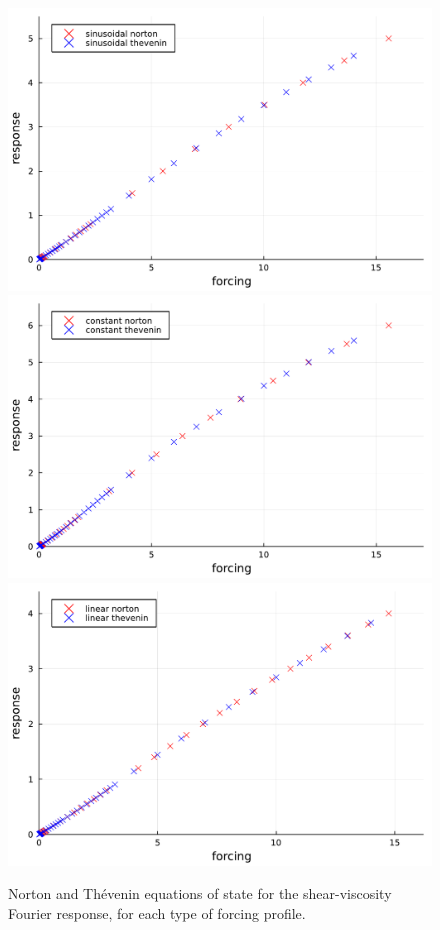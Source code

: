   \begin{figure}[htbp]
    \begin{center}
      \includegraphics[width=0.75\linewidth]{figures/sinusoidal_joint.pdf}
      \includegraphics[width=0.75\linewidth]{figures/constant_joint.pdf}
      \includegraphics[width=0.75\linewidth]{figures/linear_joint.pdf}
      \caption{ \label{fig:norton_sv_nonlinear_response}
        Norton and Thévenin equations of state for the shear-viscosity Fourier response, for each type of forcing profile.
      }
    \end{center}
  \end{figure}
